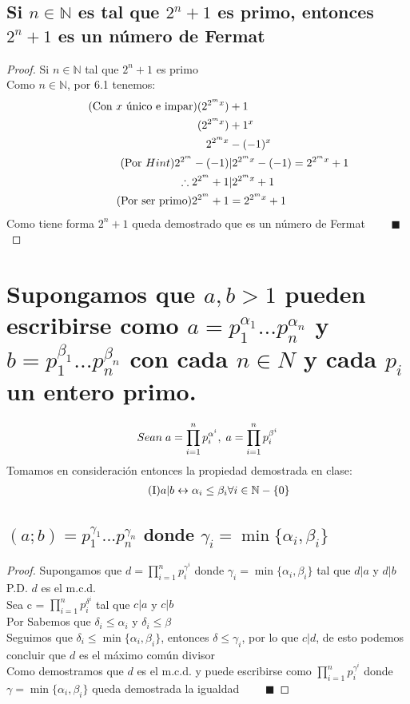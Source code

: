 \documentclass[14pt]{extarticle}
\newcommand{\mysection}[2]{\setcounter{section}{#1}\addtocounter{section}{-1}\section{#2}}
\begin{document}
    \subsection{Si $n \in \mathbb{N}$ es tal que $2^n + 1$ es primo, entonces $2^n + 1$ es un número de Fermat} 
        \begin{proof}
            Si $n \in \mathbb{N}$ tal que $2^n+1$ es primo \\
            Como $ n \in \mathbb{N}$, por 6.1 tenemos:
            \begin{align}
                \tag{Con $x$ único e impar} (2^{2^mx})&+1 \\
                \notag (2^{2^mx})&+1^x \\  
                \notag 2^{2^mx}&-(-1)^x \\
                \tag{Por $Hint$} 2^{2^m}-(-1) &| 2^{2^mx} -(-1) = 2^{2^mx}+1 \\
                \notag \therefore 2^{2^m}+1 &| 2^{2^mx}+1 \\
                \tag{Por ser primo} 2^{2^m} + 1 &= 2^{2^mx}+1
            \end{align}
            Como tiene forma $2^n+1$ queda demostrado que es un número de Fermat $\qquad \blacksquare$
        \end{proof}
\mysection{8}{Supongamos que $a,b > 1$ pueden escribirse como $a = p_1^{\alpha_1}...p_n^{\alpha_n}$ y $ b =p_1^{\beta_1}...p_n^{\beta_n}$ con cada $n \in N$ y cada $p_i$ un entero primo.}
    \begin{align}
        \notag Sean \; a = \prod_{i=1}^{n} p_i^{\alpha^i}, \; a = \prod_{i=1}^{n} p_i^{\beta^i}
    \end{align}
    Tomamos en consideración entonces la propiedad demostrada en clase: 
    \begin{align}
        \tag{\MakeUppercase{\romannumeral 1}}a | b \leftrightarrow \alpha_i \leq \beta_i \forall i \in \mathbb{N}-\{0\}
    \end{align}
    \subsection{$(a;b) = p_1^{\gamma_1}...p_n^{\gamma_n}$ donde $\gamma_i = \min\{\alpha_i,\beta_i\} $}
        \begin{proof}
        Supongamos que $d = \displaystyle \prod_{i=1}^{n} p_i^{\gamma^i}$ donde $\gamma_i = \min\{\alpha_i,\beta_i\}$  tal que $d|a$ y $d|b$ \\
        P.D. $d$ es el m.c.d. \\
        Sea c = $\displaystyle \prod_{i=1}^{n} p_i^{\delta^i}$ tal que $c|a$ y $c|b$ \\
        Por \MakeUppercase{} Sabemos que $\delta_i \leq \alpha_i$ y $\delta_i \leq \beta$ \\
        Seguimos que $\delta_i \leq \min\{\alpha_i,\beta_i\}$, entonces $\delta \leq \gamma_i $, por lo que $c|d$, de esto podemos concluir que $d$ es el máximo común divisor \\
        Como demostramos que $d$ es el m.c.d. y puede escribirse como $\displaystyle \prod_{i=1}^{n} p_i^{\gamma^i}$ donde $\gamma = \min\{\alpha_i,\beta_i\}$ queda demostrada la igualdad $\qquad \blacksquare$
        \end{proof}
\end{document}
